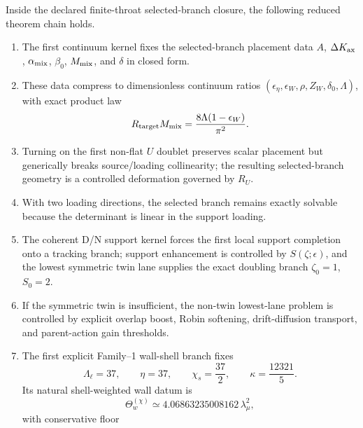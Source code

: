 \begin{theorem}
\label{thm:part03-support-family1}
Inside the declared finite-throat selected-branch closure, the following reduced theorem chain holds.
\begin{enumerate}[leftmargin=2.2em]
  \item The first continuum kernel fixes the selected-branch placement data \(A\), \(\Delta K_{\rm ax}\), \(\alpha_{\rm mix}\), \(\beta_0\), \(M_{\rm mix}\), and \(\delta\) in closed form.
  \item These data compress to dimensionless continuum ratios \((\epsilon_\eta,\epsilon_W,\rho,Z_W,\delta_0,\Lambda)\), with exact product law
  \begin{equation}
  \label{eq:part03-theorem-product-law}
  R_{\rm target}M_{\rm mix}=\frac{8\Lambda(1-\epsilon_W)}{\pi^2}.
  \end{equation}
  \item Turning on the first non-flat \(U\) doublet preserves scalar placement but generically breaks source/loading collinearity; the resulting selected-branch geometry is a controlled deformation governed by \(R_U\).
  \item With two loading directions, the selected branch remains exactly solvable because the determinant is linear in the support loading.
  \item The coherent D/N support kernel forces the first local support completion onto a tracking branch; support enhancement is controlled by \(S(\zeta;\epsilon)\), and the lowest symmetric twin lane supplies the exact doubling branch \(\zeta_0=1\), \(S_0=2\).
  \item If the symmetric twin is insufficient, the non-twin lowest-lane problem is controlled by explicit overlap boost, Robin softening, drift-diffusion transport, and parent-action gain thresholds.
  \item The first explicit Family--1 wall-shell branch fixes
  \begin{equation}
  \label{eq:part03-theorem-family1-values}
  \Lambda_\ell=37,
  \qquad
  \eta=37,
  \qquad
  \chi_s=\frac{37}{2},
  \qquad
  \kappa=\frac{12321}{5}.
  \end{equation}
  Its natural shell-weighted wall datum is
  \begin{equation}
  \label{eq:part03-theorem-theta-chi}
  \Theta_w^{(\chi)}\simeq4.06863235008162\,\lambda_\mu^2,
  \end{equation}
  with conservative floor
  \begin{equation}

\end{equation}
\end{enumerate}
\end{theorem}
